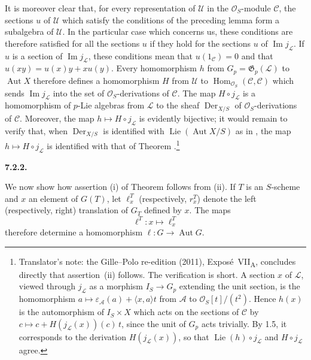 It is moreover clear that, for every representation of \(\mathcal U\) in
the \(\mathcal O_S\)-module \(\mathcal C\), the sections \(u\) of
\(\mathcal U\) which satisfy the conditions of the preceding lemma form a
subalgebra of \(\mathcal U\). In the particular case which concerns us,
these conditions are therefore satisfied for all the sections \(u\) if
they hold for the sections \(u\) of \(\operatorname{Im}j_{\mathcal L}\). If
\(u\) is a section of \(\operatorname{Im}j_{\mathcal L}\), these
conditions mean that \(u(1_{\mathcal C})=0\) and that
\(u(xy)=u(x)y+xu(y)\). Every homomorphism \(h\) from
\(G_p=\mathfrak G_p(\mathcal L)\) to \(\operatorname{Aut}X\) therefore
defines a homomorphism \(H\) from \(\mathcal U\) to
\(\operatorname{Hom}_{\mathcal O_S}(\mathcal C,\mathcal C)\) which sends
\(\operatorname{Im}j_{\mathcal L}\) into the set of
\(\mathcal O_S\)-derivations of \(\mathcal C\). The map
\(H\circ j_{\mathcal L}\) is a homomorphism of \(p\)-Lie algebras from
\(\mathcal L\) to the sheaf \(\operatorname{Der}_{X/S}\) of
\(\mathcal O_S\)-derivations of \(\mathcal C\). Moreover, the map
\(h\mapsto H\circ j_{\mathcal L}\) is evidently bijective; it would remain
to verify that, when \(\operatorname{Der}_{X/S}\) is identified with
\(\operatorname{Lie}(\operatorname{Aut}X/S)\) as in , the map
\(h\mapsto H\circ j_{\mathcal L}\) is identified with that of Theorem
.\footnote{Translator's note: the Gille--Polo re-edition (2011),
Expos\'e~VII\textsubscript{A}, concludes directly that assertion~(ii)
follows. The verification is short. A section \(x\) of \(\mathcal L\),
viewed through \(j_{\mathcal L}\) as a morphism \(I_S\to G_p\) extending
the unit section, is the homomorphism
\(a\mapsto\varepsilon_{\mathcal A}(a)+\langle x,a\rangle t\) from
\(\mathcal A\) to \(\mathcal O_S[t]/(t^2)\). Hence \(h(x)\) is the
automorphism of \(I_S\times X\) which acts on the sections of
\(\mathcal C\) by \(c\mapsto c+H(j_{\mathcal L}(x))(c)\,t\), since the
unit of \(G_p\) acts trivially. By 1.5, it corresponds to the derivation
\(H(j_{\mathcal L}(x))\), so that
\(\operatorname{Lie}(h)\circ j_{\mathcal L}\) and
\(H\circ j_{\mathcal L}\) agree.}

\medskip
\noindent\textbf{7.2.2.}
\label{sga3:VIIA:7.2.2}

We now show how assertion (i) of Theorem  follows from (ii). If
\(T\) is an \(S\)-scheme and \(x\) an element of \(G(T)\), let
\(\ell_x^T\) (respectively, \(r_x^T\)) denote the left
(respectively, right) translation of \(G_T\) defined by \(x\).
The maps
\[
  \ell^T:x\longmapsto\ell_x^T
\]
therefore determine a homomorphism
\(\ell:G\to\operatorname{Aut}G\).

